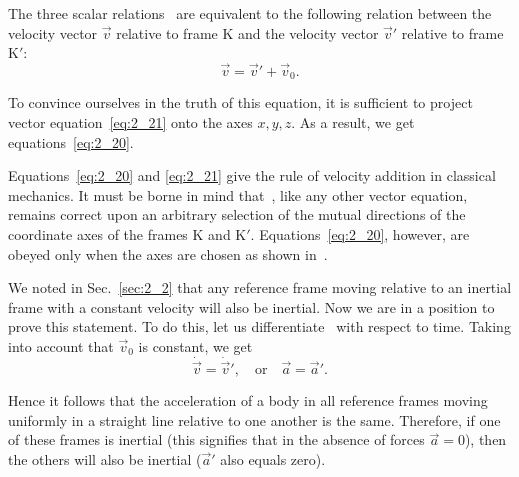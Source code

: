The three scalar relations~ are equivalent to the following relation between the velocity vector $\vec{v}$ relative to frame K and the velocity vector $\vec{v}'$ relative to frame K$'$:
\begin{equation}\label{eq:2_21}
\vec{v} = \vec{v}' + \vec{v}_0.
\end{equation}

\noindent
To convince ourselves in the truth of this equation, it is sufficient to project vector equation~\eqref{eq:2_21} onto the axes $x, y, z$. As a result, we get equations~\eqref{eq:2_20}.

Equations~\eqref{eq:2_20} and \eqref{eq:2_21} give the rule of velocity addition in classical mechanics. It must be borne in mind that~, like any other vector equation, remains correct upon an arbitrary selection of the mutual directions of the coordinate axes of the frames K and K$'$. Equations~\eqref{eq:2_20}, however, are obeyed only when the axes are chosen as shown in~.

We noted in Sec.~\ref{sec:2_2} that any reference frame moving relative to an inertial frame with a constant velocity will also be inertial. Now we are in a position to prove this statement. To do this, let us differentiate~ with respect to time. Taking into account that $\vec{v}_0$ is constant, we get
\begin{equation}\label{eq:2_22}
\dot{\vec{v}} = \dot{\vec{v}}', \quad\text{or}\quad  \vec{a} = \vec{a}'.
\end{equation}

\noindent
Hence it follows that the acceleration of a body in all reference frames moving uniformly in a straight line relative to one another is the same. Therefore, if one of these frames is inertial (this signifies that in the absence of forces $\vec{a}=0$), then the others will also be inertial ($\vec{a}'$ also equals zero).

